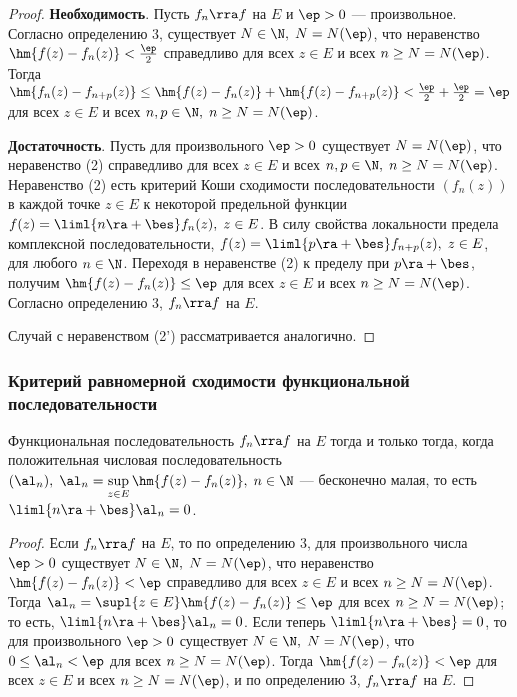 \documentclass[a4paper]{article}
\begin{document}
\begin{proof}
\textbf{Необходимость}. Пусть $f_n\rra f$ на $E$ и $\ep>0$ ---
произвольное. Согласно определению 3, существует $N\in\N, \;
N=N(\ep)$, что неравенство $\hm{f(z)-f_n(z)} < \frac{\ep}2$
справедливо для всех $z\in E$ и всех $n\ge N=N(\ep)$. Тогда
$\hm{f_n(z) - f_{n+p}(z)} \le \hm{f(z) - f_n(z)} + \hm{f(z) -
f_{n+p}(z)} < \frac{\ep}2+ \frac{\ep}2 = \ep$ для всех $z\in E$ и
всех $n,p\in\N, \; n\ge N=N(\ep)$.

\textbf{Достаточность}. Пусть для произвольного $\ep>0$ существует
$N=N(\ep)$, что неравенство (2) справедливо для всех $z\in E$ и всех
$n,p\in\N, \; n \ge N=N(\ep)$. Неравенство (2) есть критерий Коши
сходимости последовательности $(f_n(z))$ в каждой точке $z\in E$ к
некоторой предельной функции $f(z) = \liml{n\ra+\bes} f_n(z), \;
z\in E$. В силу свойства локальности предела комплексной
последовательности, $f(z) = \liml{p\ra+\bes} f_{n+p}(z), \; z\in E$,
для любого $n\in\N$. Переходя в неравенстве (2) к пределу при
$p\ra+\bes$, получим $\hm{f(z) - f_n(z)} \le \ep$ для всех $z\in E$
и всех $n\ge N = N(\ep)$. Согласно определению 3, $f_n\rra f$ на
$E$.

Случай с неравенством (2') рассматривается аналогично.
\end{proof}

\subsubsection{Критерий равномерной сходимости функциональной
последовательности}

\begin{theorem}
Функциональная последовательность $f_n\rra f$ на $E$ тогда и только
тогда, когда положительная числовая последовательность $(\al_n), \;
\al_n = \sup\limits_{z\in E} \hm{f(z) - f_n(z)}, \; n\in\N$ ---
бесконечно малая, то есть $\liml{n\ra+\bes}\al_n=0$.
\end{theorem}

\begin{proof}
Если $f_n\rra f$ на $E$, то по определению 3, для произвольного
числа $\ep>0$ существует $N\in\N, \; N=N(\ep)$, что неравенство
$\hm{f(z) - f_n(z)}<\ep$ справедливо для всех $z\in E$ и всех $n\ge
N=N(\ep)$. Тогда $\al_n = \supl{z\in E}\hm{f(z) - f_n(z)}\le\ep$ для
всех $n\ge N=N(\ep)$; то есть, $\liml{n\ra+\bes}\al_n = 0$. Если
теперь $\liml{n\ra+\bes}=0$, то для произвольного $\ep>0$ существует
$N\in\N, \; N=N(\ep)$, что $0\le\al_n < \ep$ для всех $n\ge
N=N(\ep)$. Тогда $\hm{f(z)-f_n(z)}<\ep$ для всех $z\in E$ и всех
$n\ge N=N(\ep)$, и по определению 3, $f_n\rra f$ на $E$.
\end{proof}
\end{document}
